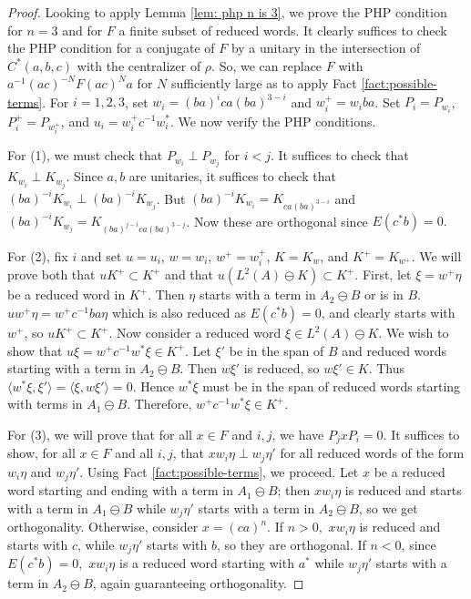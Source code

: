 \documentclass{amsart}
\theoremstyle{definition}
\begin{document}
\begin{proof}
      Looking to apply Lemma \ref{lem: php n is 3}, we prove the PHP condition for $n=3$ and for $F$ a finite subset of reduced words. It clearly suffices to check the PHP condition for a conjugate of $F$ by a unitary in the intersection of $C^\ast(a, b, c)$ with the centralizer of $\rho$. So, we can replace $F$ with $a^{-1}(ac)^{-N}F(ac)^Na$ for $N$ sufficiently large as to apply Fact \ref{fact:possible-terms}. For $i=1,2,3$, set $w_i = (ba)^ica(ba)^{3-i}$ and $w_i^+ = w_iba$. Set $P_i = P_{w_i}$, $P_i^+ = P_{w_i^+}$, and $u_i = w_i^+c^{-1}w_i^*$. We now verify the PHP conditions.

      For (1), we must check that $P_{w_i}\perp P_{w_j}$ for $i< j$. It suffices to check that $K_{w_i}\perp K_{w_j}$. Since $a,b$ are unitaries, it suffices to check that $(ba)^{-i}K_{w_i} \perp (ba)^{-i}K_{w_j}$. But $(ba)^{-i}K_{w_i} = K_{ca(ba)^{3-i}}$ and $(ba)^{-i}K_{w_j} = K_{(ba)^{j-i}ca(ba)^{3-j}}$. Now these are orthogonal since $E(c^*b) = 0.$

      For (2), fix $i$ and set $u=u_i$, $w=w_i$, $w^+=w_i^+$, $K = K_{w}$, and $K^+ = K_{w^+}$. We will prove both that $uK^+\subset K^+$ and that $u(L^2(A)\ominus K)\subset K^+$. First, let $\xi = w^+\eta$ be a reduced word in $K^+$. Then $\eta$ starts with a term in $A_2\ominus B$ or is in $B$. $uw^+\eta = w^+c^{-1}ba\eta$ which is also reduced as $E(c^*b) = 0$, and clearly starts with $w^+$, so $uK^+\subset K^+$. Now consider a reduced word $\xi \in L^2(A)\ominus K$. We wish to show that $u\xi = w^+c^{-1}w^*\xi \in K^+$. Let $\xi'$ be in the span of $B$ and reduced words starting with a term in $A_2\ominus B$. Then $w\xi'$ is reduced, so $w\xi' \in K$. Thus $\langle w^*\xi,\xi'\rangle=\langle \xi,w\xi'\rangle = 0$. Hence $w^*\xi$ must be in the span of reduced words starting with terms in $A_1\ominus B$. Therefore, $w^+c^{-1}w^*\xi \in K^+$.

      For (3), we will prove that for all $x\in F$ and $i,j$, we have $P_jxP_i=0.$ It suffices to show, for all $x\in F$ and all $i,j$, that $xw_i\eta \perp w_j\eta'$ for all reduced words of the form $w_i\eta$ and $w_j\eta'$. Using Fact \ref{fact:possible-terms}, we proceed. Let $x$ be a reduced word starting and ending with a term in $A_1\ominus B$; then $xw_i\eta$ is reduced and starts with a term in $A_1\ominus B$ while $w_j\eta'$ starts with a term in $A_2\ominus B$, so we get orthogonality. Otherwise, consider $x = (ca)^n$. If $n>0,$ $xw_i\eta$ is reduced and starts with $c$, while $w_j\eta'$ starts with $b$, so they are orthogonal. If $n<0$, since $E(c^*b) = 0,$ $xw_i\eta$ is a reduced word starting with $a^*$ while $w_j\eta'$ starts with a term in $A_2\ominus B$, again guaranteeing orthogonality.     
\end{proof}
\end{document}
